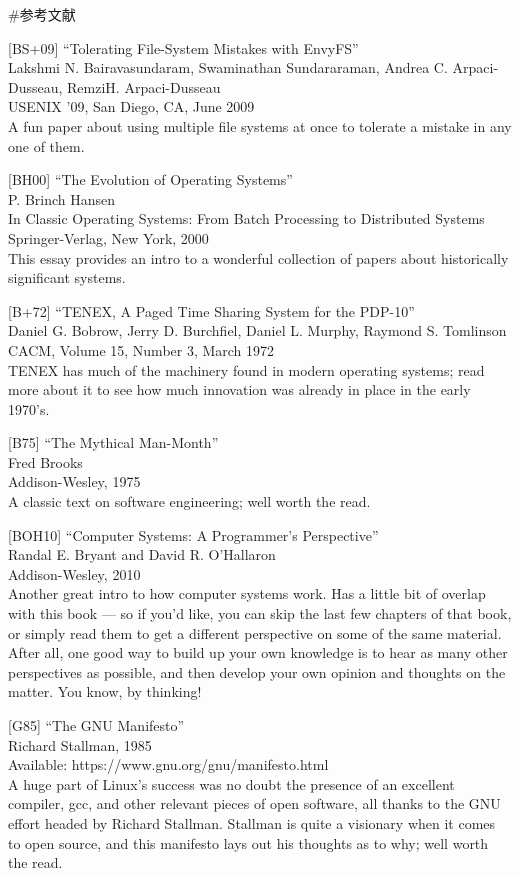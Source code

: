 \#参考文献

{[}BS+09{]} ``Tolerating File-System Mistakes with EnvyFS''\\
Lakshmi N. Bairavasundaram, Swaminathan Sundararaman, Andrea C.
Arpaci-Dusseau, RemziH. Arpaci-Dusseau\\
USENIX '09, San Diego, CA, June 2009\\
A fun paper about using multiple file systems at once to tolerate a
mistake in any one of them.

{[}BH00{]} ``The Evolution of Operating Systems''\\
P. Brinch Hansen\\
In Classic Operating Systems: From Batch Processing to Distributed
Systems Springer-Verlag, New York, 2000\\
This essay provides an intro to a wonderful collection of papers about
historically significant systems.

{[}B+72{]} ``TENEX, A Paged Time Sharing System for the PDP-10''\\
Daniel G. Bobrow, Jerry D. Burchfiel, Daniel L. Murphy, Raymond S.
Tomlinson\\
CACM, Volume 15, Number 3, March 1972\\
TENEX has much of the machinery found in modern operating systems; read
more about it to see how much innovation was already in place in the
early 1970's.

{[}B75{]} ``The Mythical Man-Month''\\
Fred Brooks\\
Addison-Wesley, 1975\\
A classic text on software engineering; well worth the read.

{[}BOH10{]} ``Computer Systems: A Programmer's Perspective''\\
Randal E. Bryant and David R. O'Hallaron\\
Addison-Wesley, 2010\\
Another great intro to how computer systems work. Has a little bit of
overlap with this book --- so if you'd like, you can skip the last few
chapters of that book, or simply read them to get a different
perspective on some of the same material. After all, one good way to
build up your own knowledge is to hear as many other perspectives as
possible, and then develop your own opinion and thoughts on the matter.
You know, by thinking!

{[}G85{]} ``The GNU Manifesto''\\
Richard Stallman, 1985\\
Available: https://www.gnu.org/gnu/manifesto.html\\
A huge part of Linux's success was no doubt the presence of an excellent
compiler, gcc, and other relevant pieces of open software, all thanks to
the GNU effort headed by Richard Stallman. Stallman is quite a visionary
when it comes to open source, and this manifesto lays out his thoughts
as to why; well worth the read.

